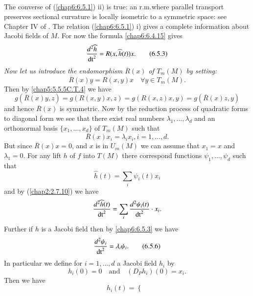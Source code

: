 \subsection{}\label{chap6:rem6.5.2}%

\begin{remark*}
The converse of (\ref{chap6:6.5.1}) ii) is true: an r.m.\@ where
parallel transport preserves sectional curvature is locally isometric
to a symmetric space: see Chapter IV of \cite{14}. The \pageoriginale
relation (\ref{chap6:6.5.1}) i) gives a complete information about Jacobi
fields of $M$. For now the formula \eqref{chap6:6.4.15} gives
\begin{equation*}
\frac{d^{2}\widehat{h}}{\operatorname{dt}^{2}}=R(x,\widehat{h}(t))x.\tag{6.5.3}\label{chap6:6.5.3}
\end{equation*}
{\em Now let us introduce the endomorphism $\overline{R}(x)$ of
$T_{m}(M)$ by setting:}
\begin{equation*}
\overline{R}(x)y=R(x,y)x\quad\forall y\in T_{m}(M).\tag{6.5.4}\label{chap6:6.5.4}
\end{equation*}
Then by \eqref{chap5:5.5.5C.T.4} we have
$$
g(\overline{R}(x)y,z)=g(R(x,y)x,z)=g(R(x,z)x,y)=g(\overline{R}(x)z,y)
$$
and hence $\overline{R}(x)$ is symmetric. Now by the reduction process
of quadratic forms to diagonal form we see that there exist real
numbers $\lambda_{1},\ldots,\lambda_{d}$ and an orthonormal basis
$\{x_{1},\ldots,x_{d}\}$ of $T_{m}(M)$ such that
\begin{equation*}
\overline{R}(x)x_{i}=\lambda_{i}x_{i}, i=1,\ldots,d.\tag{6.5.5}\label{chap6:6.5.5}
\end{equation*}
But since $\overline{R}(x)x=0$, and $x$ is in $U_{m}(M)$ we can assume
that $x_{1}=x$ and $\lambda_{1}=0$. For any lift $h$ of $f$ into
$T(M)$ there correspond functions $\psi_{1},\ldots,\psi_{d}$ such that
$$
\widehat{h}(t)=\sum_{i}\psi_{i}(t)x_{i}
$$
and by (\ref{chap2:2.7.10}) we have
$$
\frac{d^{2}\widehat{h}(t)}{\operatorname{dt}^{2}}=\sum_{i}\frac{d^{2}\psi_{i}(t)}{\operatorname{dt}^{2}}\cdot
x_{i}. 
$$
Further if $h$ is a Jacobi field then by \eqref{chap6:6.5.3} we have
\begin{equation*}
\frac{d^{2}\psi_{i}}{\operatorname{dt}^{2}}=\lambda_{i}\psi_{i}.\tag{6.5.6}\label{chap6:6.5.6}
\end{equation*}\pageoriginale
In particular we define for $i=1,\ldots,d$ a Jacobi field $h_{i}$ by
$$
h_{i}(0)=0\quad\text{and}\quad (D_{P}h_{i})(0)=x_{i}.
$$
Then we have
\begin{equation*}
h_{i}(t)=
\begin{cases}

\end{cases}
\end{equation*}
\end{remark*}
